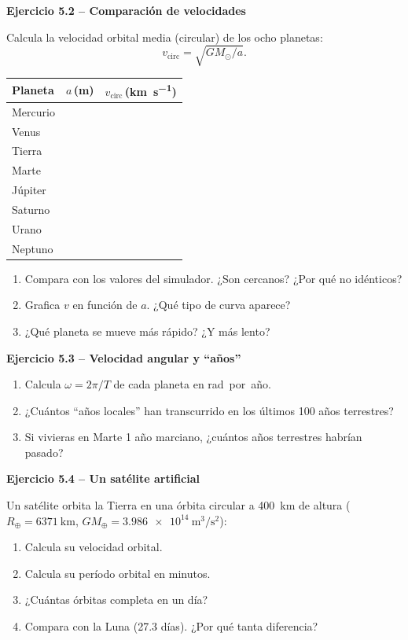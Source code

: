 \documentclass[11pt,a4paper]{article}
\newenvironment{cajaEjercicio}[1][]{\par\medskip\noindent\textbf{#1}\par\smallskip}{\par\medskip}
\theoremstyle{definition}
\newcommand{\Rearth}{\ensuremath{R_{\oplus}}}
\newcommand{\GMsun}{\ensuremath{GM_{\odot}}}
\begin{document}
\begin{cajaEjercicio}[Ejercicio 5.2 -- Comparación de velocidades]
Calcula la velocidad orbital media (circular) de los ocho planetas:
\[
  v_{\text{circ}} = \sqrt{\GMsun/a}.
\]
\begin{center}
\begin{tabular}{@{}lcc@{}}
\toprule
\textbf{Planeta} & $a$\,(\si{\metre}) & $v_{\text{circ}}$\,(\si{\kilo\metre\per\second}) \\
\midrule
Mercurio & & \\
Venus    & & \\
Tierra   & & \\
Marte    & & \\
Júpiter  & & \\
Saturno  & & \\
Urano    & & \\
Neptuno  & & \\
\bottomrule
\end{tabular}
\end{center}

\begin{enumerate}[label=\alph*),leftmargin=*]
  \item Compara con los valores del simulador. ¿Son cercanos? ¿Por qué no idénticos?
  \item Grafica $v$ en función de $a$. ¿Qué tipo de curva aparece?
  \item ¿Qué planeta se mueve más rápido? ¿Y más lento?
\end{enumerate}
\end{cajaEjercicio}

\begin{cajaEjercicio}[Ejercicio 5.3 -- Velocidad angular y ``años'']
\begin{enumerate}[label=\alph*),leftmargin=*]
  \item Calcula $\omega = 2\pi/T$ de cada planeta en \si{\radian por año}.
  \item ¿Cuántos ``años locales'' han transcurrido en los últimos \SI{100}{} años terrestres?
  \item Si vivieras en Marte \SI{1}{} año marciano, ¿cuántos años terrestres habrían pasado?
\end{enumerate}
\end{cajaEjercicio}

\begin{cajaEjercicio}[Ejercicio 5.4 -- Un satélite artificial]
Un satélite orbita la Tierra en una órbita circular a \SI{400}{\kilo\metre} de altura ($\Rearth = \SI{6371}{\kilo\metre}$, $GM_{\oplus} = \SI{3.986e14}{\cubic\metre\per\square\second}$):
\begin{enumerate}[label=\alph*),leftmargin=*]
  \item Calcula su velocidad orbital.
  \item Calcula su período orbital en minutos.
  \item ¿Cuántas órbitas completa en un día?
  \item Compara con la Luna (27.3 días). ¿Por qué tanta diferencia?
\end{enumerate}
\end{cajaEjercicio}
\end{document}
